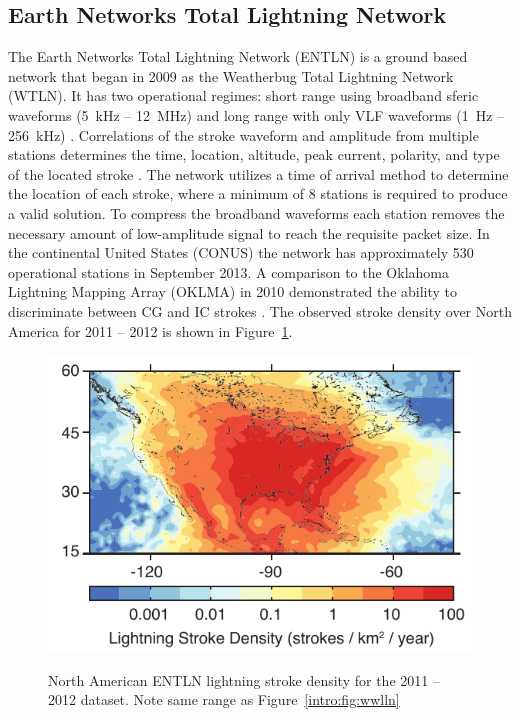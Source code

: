 \subsection{Earth Networks Total Lightning Network}

The Earth Networks Total Lightning Network (ENTLN) is a ground based network that began in 2009 as the Weatherbug Total Lightning Network (WTLN).
It has two operational regimes: short range using broadband sferic waveforms (5~kHz -- 12~MHz) and long range with only VLF waveforms (1~Hz -- 256~kHz) \citep{Heckman2010}.
Correlations of the stroke waveform and amplitude from multiple stations determines the time, location, altitude, peak current, polarity, and type of the located stroke \citep{Liu2011a}.
The network utilizes a time of arrival method to determine the location of each stroke, where a minimum of 8 stations is required to produce a valid solution.
To compress the broadband waveforms each station removes the necessary amount of low-amplitude signal to reach the requisite packet size.
In the continental United States (CONUS) the network has approximately 530 operational stations in September 2013.
A comparison to the Oklahoma Lightning Mapping Array (OKLMA) in 2010 demonstrated the ability to discriminate between CG and IC strokes \citep{Beasley2010}.
The observed stroke density over North America for 2011 -- 2012 is shown in Figure~\ref{intro:fig:entln}.

\begin{figure}[ht!]
	\centering
	\includegraphics[scale=1]{Introduction/Figures/entln_density.pdf}\\
	\caption{North American ENTLN lightning stroke density for the 2011 -- 2012 dataset.
	              Note same range as Figure~\ref{intro:fig:wwlln}}
	\label{intro:fig:entln}
\end{figure}

